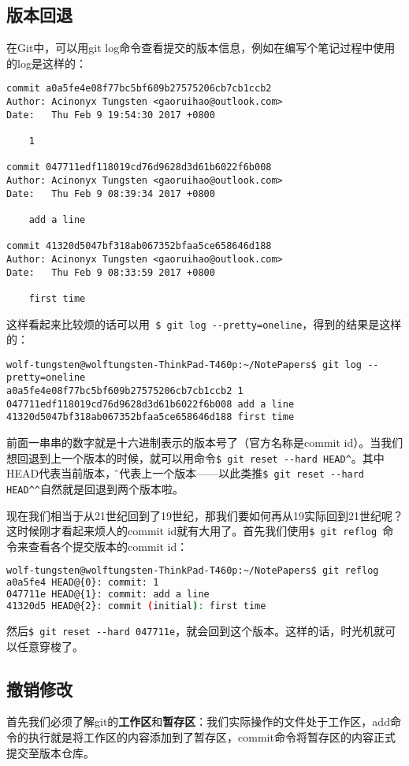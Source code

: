 \documentclass[UTF8]{ctexart}
\begin{document}
\subsection{版本回退}
在Git中，可以用git log命令查看提交的版本信息，例如在编写个笔记过程中使用的log是这样的：
\begin{lstlisting}
commit a0a5fe4e08f77bc5bf609b27575206cb7cb1ccb2
Author: Acinonyx Tungsten <gaoruihao@outlook.com>
Date:   Thu Feb 9 19:54:30 2017 +0800

    1

commit 047711edf118019cd76d9628d3d61b6022f6b008
Author: Acinonyx Tungsten <gaoruihao@outlook.com>
Date:   Thu Feb 9 08:39:34 2017 +0800

    add a line

commit 41320d5047bf318ab067352bfaa5ce658646d188
Author: Acinonyx Tungsten <gaoruihao@outlook.com>
Date:   Thu Feb 9 08:33:59 2017 +0800

    first time
\end{lstlisting}

这样看起来比较烦的话可以用\verb！ $ git log --pretty=oneline！，得到的结果是这样的：
\begin{lstlisting}
wolf-tungsten@wolftungsten-ThinkPad-T460p:~/NotePapers$ git log --pretty=oneline
a0a5fe4e08f77bc5bf609b27575206cb7cb1ccb2 1
047711edf118019cd76d9628d3d61b6022f6b008 add a line
41320d5047bf318ab067352bfaa5ce658646d188 first time
\end{lstlisting}

前面一串串的数字就是十六进制表示的版本号了（官方名称是commit id）。当我们想回退到上一个版本的时候，就可以用命令\verb!$ git reset --hard HEAD^!。其中HEAD代表当前版本，\^就代表上一个版本——以此类推\verb!$ git reset --hard HEAD^^!自然就是回退到两个版本啦。

现在我们相当于从21世纪回到了19世纪，那我们要如何再从19实际回到21世纪呢？这时候刚才看起来烦人的commit id就有大用了。首先我们使用\verb!$ git reflog !命令来查看各个提交版本的commit id：
\begin{lstlisting}[language=bash]
wolf-tungsten@wolftungsten-ThinkPad-T460p:~/NotePapers$ git reflog
a0a5fe4 HEAD@{0}: commit: 1
047711e HEAD@{1}: commit: add a line
41320d5 HEAD@{2}: commit (initial): first time
\end{lstlisting}
然后\verb!$ git reset --hard 047711e!，就会回到这个版本。这样的话，时光机就可以任意穿梭了。

\subsection{撤销修改}
首先我们必须了解git的\textbf{工作区}和\textbf{暂存区}：我们实际操作的文件处于工作区，add命令的执行就是将工作区的内容添加到了暂存区，commit命令将暂存区的内容正式提交至版本仓库。
\end{document}
